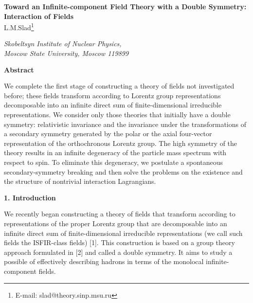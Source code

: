 \documentclass[a4paper,12pt]{article}
\begin{document}
\vspace*{1.0 cm}

\begin{center}
{\Large \bf Toward an Infinite-component Field Theory with a Double Symmetry:
Interaction of Fields} \\

\vspace{1.0 cm}
\renewcommand{\thefootnote}{*}
{\large L.M.Slad\footnote{E-mail: slad@theory.sinp.msu.ru}} \\

\vspace{0.4 cm}

{\it Skobeltsyn Institute of Nuclear Physics, \\
Moscow State University, Moscow 119899}
\end{center}

\vspace{0.5 cm}

\centerline{\bf Abstract}

\begin{small}
We complete the first stage of constructing a theory of fields not investigated
before; these fields transform according to Lorentz group representations
decomposable into an infinite direct sum of finite-dimensional irreducible
representations. We consider only those theories that initially have a double
symmetry: relativistic invariance and the invariance under the transformations
of a secondary symmetry generated by the polar or the axial four-vector
representation of the orthochronous Lorentz group. The high symmetry of the
theory results in an infinite degeneracy of the particle mass spectrum with
respect to spin. To eliminate this degeneracy, we postulate a spontaneous
secondary-symmetry breaking and then solve the problems on the existence and
the structure of nontrivial interaction Lagrangians.
\end{small}

\vspace{0.5 cm}

\begin{center}
{\large \bf 1. Introduction}
\end{center}

We recently began constructing a theory of fields that transform according 
to representations of the proper Lorentz group \coordHE{} that are
decomposable into an infinite direct sum of finite-dimensional irreducible
representations (we call such fields the ISFIR-class fields) [1]. This
construction is based on a group theory approach formulated in [2] and called
a double symmetry. It aims to study a possible of effectively describing 
hadrons in terms of the monolocal infinite-component fields.
  
\end{document}
